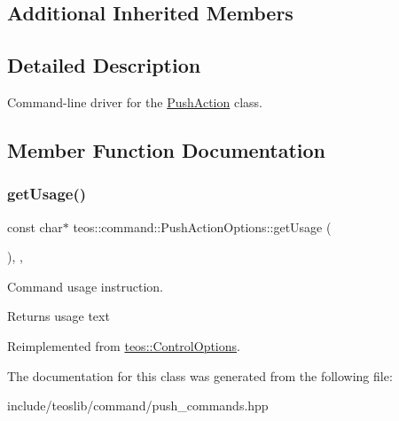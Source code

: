 \subsection*{Additional Inherited Members}


\subsection{Detailed Description}
Command-\/line driver for the \mbox{\hyperlink{classteos_1_1command_1_1_push_action}{Push\+Action}} class. 

\subsection{Member Function Documentation}
\mbox{\label{classteos_1_1command_1_1_push_action_options_a1dac78e7b40cc0ff91895d1fc0f7d2b4}} 
\subsubsection{\texorpdfstring{get\+Usage()}{getUsage()}}
{\footnotesize\ttfamily const char$\ast$ teos\+::command\+::\+Push\+Action\+Options\+::get\+Usage (\begin{DoxyParamCaption}{ }\end{DoxyParamCaption})\hspace{0.3cm}{\ttfamily [inline]}, {\ttfamily [protected]}, {\ttfamily [virtual]}}



Command \textquotesingle{}usage\textquotesingle{} instruction. 

\begin{DoxyReturn}{Returns}
usage text 
\end{DoxyReturn}


Reimplemented from \mbox{\hyperlink{classteos_1_1_control_options_a0aa5671f9bc750ed5280c26c543874f3}{teos\+::\+Control\+Options}}.



The documentation for this class was generated from the following file\+:\begin{DoxyCompactItemize}
\item 
include/teoslib/command/push\+\_\+commands.\+hpp\end{DoxyCompactItemize}
